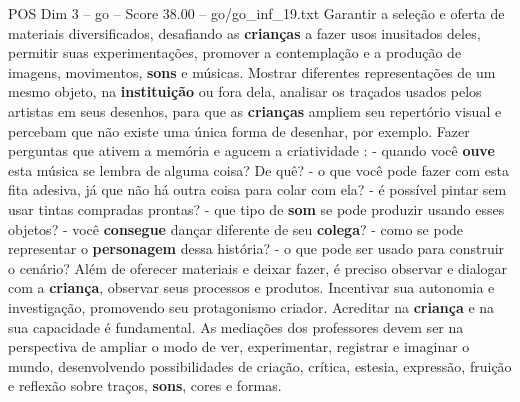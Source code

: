 \begin{textsample}{POS Dim 3 – go – Score 38.00 – go/go\_inf\_19.txt}
Garantir a seleção e oferta de materiais diversificados, desafiando as \textbf{crianças} a fazer usos inusitados deles, permitir suas experimentações, promover a contemplação e a produção de imagens, movimentos, \textbf{sons} e músicas.
Mostrar diferentes representações de um mesmo objeto, na \textbf{instituição} ou fora dela, analisar os traçados usados pelos artistas em seus desenhos, para que as \textbf{crianças} ampliem seu repertório visual e percebam que não existe uma única forma de desenhar, por exemplo.
Fazer perguntas que ativem a memória e agucem a criatividade : - quando você \textbf{ouve} esta música se lembra de alguma coisa?
De quê? - o que você pode fazer com esta fita adesiva, já que não há outra coisa para colar com ela? - é possível pintar sem usar tintas compradas prontas? - que tipo de \textbf{som} se pode produzir usando esses objetos? - você \textbf{consegue} dançar diferente de seu \textbf{colega}? - como se pode representar o \textbf{personagem} dessa história? - o que pode ser usado para construir o cenário?
Além de oferecer materiais e deixar fazer, é preciso observar e dialogar com a \textbf{criança}, observar seus processos e produtos.
Incentivar sua autonomia e investigação, promovendo seu protagonismo criador.
Acreditar na \textbf{criança} e na sua capacidade é fundamental.
As mediações dos professores devem ser na perspectiva de ampliar o modo de ver, experimentar, registrar e imaginar o mundo, desenvolvendo possibilidades de criação, crítica, estesia, expressão, fruição e reflexão sobre traços, \textbf{sons}, cores e formas.

\end{textsample}
